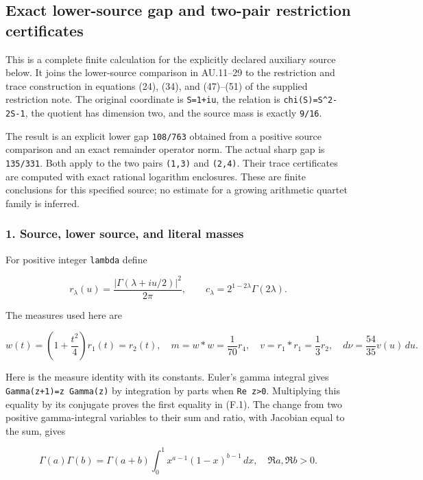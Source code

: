 \subsection{Exact lower-source gap and two-pair restriction certificates}\label{endpoint-restriction_fixture--exact-lower-source-gap-and-two-pair-restriction-certificates}

This is a complete finite calculation for the explicitly declared auxiliary source below. It joins the lower-source comparison in AU.11--29 to the restriction and trace construction in equations (24), (34), and (47)--(51) of the supplied restriction note. The original coordinate is \nolinkurl{S=1+iu}, the relation is \texttt{chi(S)=S\^{}2-2S-1}, the quotient has dimension two, and the source mass is exactly \nolinkurl{9/16}.

The result is an explicit lower gap \nolinkurl{108/763} obtained from a positive source comparison and an exact remainder operator norm. The actual sharp gap is \nolinkurl{135/331}. Both apply to the two pairs \nolinkurl{(1,3)} and \nolinkurl{(2,4)}. Their trace certificates are computed with exact rational logarithm enclosures. These are finite conclusions for this specified source; no estimate for a growing arithmetic quartet family is inferred.

\subsubsection{1. Source, lower source, and literal masses}\label{endpoint-restriction_fixture--source-lower-source-and-literal-masses}

For positive integer \nolinkurl{lambda} define

\[
r_\lambda(u)=\frac{|\Gamma(\lambda+iu/2)|^2}{2\pi},
\qquad c_\lambda=2^{1-2\lambda}\Gamma(2\lambda).
\]

The measures used here are

\[
w(t)=\left(1+\frac{t^2}{4}\right)r_1(t)=r_2(t),
\quad m=w*w=\frac1{70}r_4,
\quad v=r_1*r_1=\frac13r_2,
\quad d\nu=\frac{54}{35}v(u)\,du.
\tag{F.1}
\]

Here is the measure identity with its constants. Euler's gamma integral gives \texttt{Gamma(z+1)=z\ Gamma(z)} by integration by parts when \texttt{Re\ z\textgreater{}0}. Multiplying this equality by its conjugate proves the first equality in (F.1). The change from two positive gamma-integral variables to their sum and ratio, with Jacobian equal to the sum, gives

\[
\Gamma(a)\Gamma(b)
=\Gamma(a+b)\int_0^1x^{a-1}(1-x)^{b-1}\,dx,
\quad \Re a,\Re b>0.
\]

